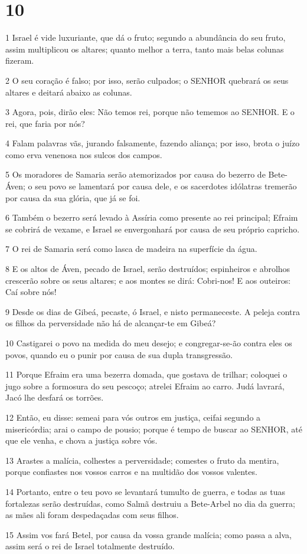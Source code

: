 \chapter{10}

\par 1 Israel é vide luxuriante, que dá o fruto; segundo a abundância do seu fruto, assim multiplicou os altares; quanto melhor a terra, tanto mais belas colunas fizeram.
\par 2 O seu coração é falso; por isso, serão culpados; o SENHOR quebrará os seus altares e deitará abaixo as colunas.
\par 3 Agora, pois, dirão eles: Não temos rei, porque não tememos ao SENHOR. E o rei, que faria por nós?
\par 4 Falam palavras vãs, jurando falsamente, fazendo aliança; por isso, brota o juízo como erva venenosa nos sulcos dos campos.
\par 5 Os moradores de Samaria serão atemorizados por causa do bezerro de Bete-Áven; o seu povo se lamentará por causa dele, e os sacerdotes idólatras tremerão por causa da sua glória, que já se foi.
\par 6 Também o bezerro será levado à Assíria como presente ao rei principal; Efraim se cobrirá de vexame, e Israel se envergonhará por causa de seu próprio capricho.
\par 7 O rei de Samaria será como lasca de madeira na superfície da água.
\par 8 E os altos de Áven, pecado de Israel, serão destruídos; espinheiros e abrolhos crescerão sobre os seus altares; e aos montes se dirá: Cobri-nos! E aos outeiros: Caí sobre nós!
\par 9 Desde os dias de Gibeá, pecaste, ó Israel, e nisto permaneceste. A peleja contra os filhos da perversidade não há de alcançar-te em Gibeá?
\par 10 Castigarei o povo na medida do meu desejo; e congregar-se-ão contra eles os povos, quando eu o punir por causa de sua dupla transgressão.
\par 11 Porque Efraim era uma bezerra domada, que gostava de trilhar; coloquei o jugo sobre a formosura do seu pescoço; atrelei Efraim ao carro. Judá lavrará, Jacó lhe desfará os torrões.
\par 12 Então, eu disse: semeai para vós outros em justiça, ceifai segundo a misericórdia; arai o campo de pousio; porque é tempo de buscar ao SENHOR, até que ele venha, e chova a justiça sobre vós.
\par 13 Arastes a malícia, colhestes a perversidade; comestes o fruto da mentira, porque confiastes nos vossos carros e na multidão dos vossos valentes.
\par 14 Portanto, entre o teu povo se levantará tumulto de guerra, e todas as tuas fortalezas serão destruídas, como Salmã destruiu a Bete-Arbel no dia da guerra; as mães ali foram despedaçadas com seus filhos.
\par 15 Assim vos fará Betel, por causa da vossa grande malícia; como passa a alva, assim será o rei de Israel totalmente destruído.

